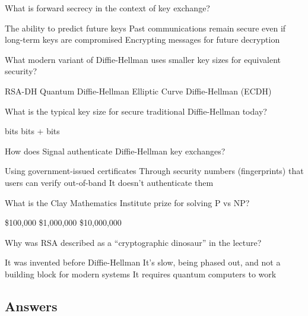 \documentclass[10pt,a4paper,american]{exam}
\begin{document}
\begin{questions}
	\question What is forward secrecy in the context of key exchange?
	\begin{randomizechoices}
		\choice The ability to predict future keys
		\CorrectChoice Past communications remain secure even if long-term keys are compromised
		\choice Encrypting messages for future decryption
	\end{randomizechoices}

	\question What modern variant of Diffie-Hellman uses smaller key sizes for equivalent security?
	\begin{randomizechoices}
		\choice RSA-DH
		\choice Quantum Diffie-Hellman
		\CorrectChoice Elliptic Curve Diffie-Hellman (ECDH)
	\end{randomizechoices}

	\question What is the typical key size for secure traditional Diffie-Hellman today?
	\begin{randomizechoices}
		 bits
		 bits
		+ bits
	\end{randomizechoices}

	\question How does Signal authenticate Diffie-Hellman key exchanges?
	\begin{randomizechoices}
		\choice Using government-issued certificates
		\CorrectChoice Through security numbers (fingerprints) that users can verify out-of-band
		\choice It doesn't authenticate them
	\end{randomizechoices}

	\question What is the Clay Mathematics Institute prize for solving P vs NP?
	\begin{randomizechoices}
		\choice \$100,000
		\CorrectChoice \$1,000,000
		\choice \$10,000,000
	\end{randomizechoices}

	\question Why was RSA described as a ``cryptographic dinosaur'' in the lecture?
	\begin{randomizechoices}
		\choice It was invented before Diffie-Hellman
		\CorrectChoice It's slow, being phased out, and not a building block for modern systems
		\choice It requires quantum computers to work
	\end{randomizechoices}

\end{questions}

\clearpage

\subsection*{Answers}
\printkeytable
\end{document}

